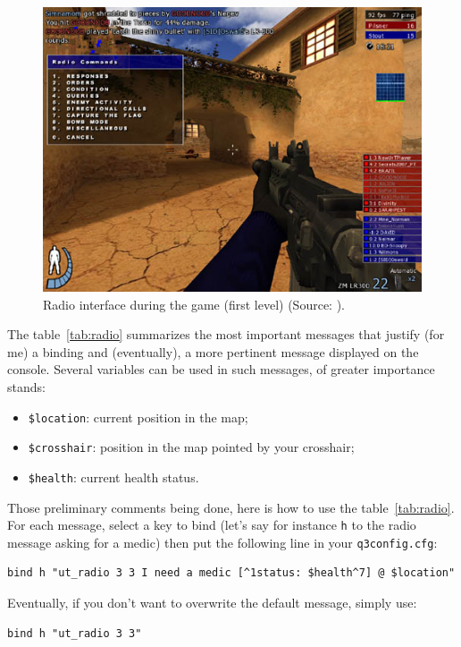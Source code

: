 \begin{figure}[ht]
  \centering\includegraphics[scale=0.4]{Images/Ui_radiointerface.jpg}
  \caption{\small Radio interface during the game (first level) (Source: \cite{urt}).}
  \label{fig:radio}
\end{figure}

The table~\ref{tab:radio} summarizes the most important messages that justify
(for me) a binding and (eventually), a more pertinent message displayed on the
console. Several variables can be used in such messages, of greater importance stands: 
\begin{itemize}\setitemsep
\item \texttt{\$location}:  current position in the map;
\item \texttt{\$crosshair}: position in the map pointed by your crosshair;
\item \texttt{\$health}:    current health status.
\end{itemize}

Those preliminary comments being done, here is how to use the
table~\ref{tab:radio}. 
For each message, select a key to bind (let's say for instance \texttt{h} to the
radio message asking for a medic) then put the following line in your
\texttt{q3config.cfg}:
\begin{lstlisting}[style=filecontent]
bind h "ut_radio 3 3 I need a medic [^1status: $health^7] @ $location"
\end{lstlisting}
Eventually, if you don't want to overwrite the default message, simply use:
\begin{lstlisting}[style=filecontent]
bind h "ut_radio 3 3"
\end{lstlisting}


